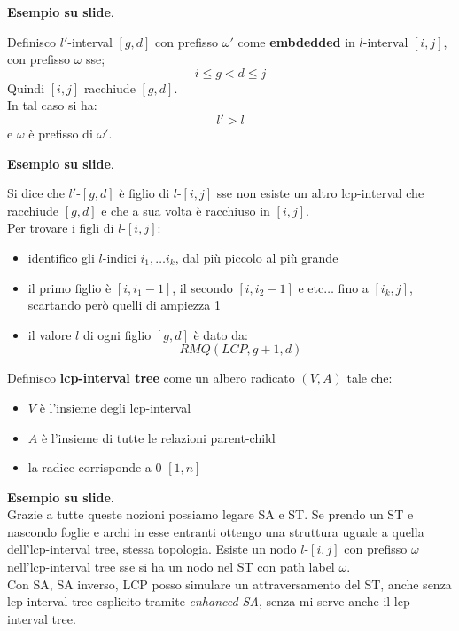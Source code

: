 \documentclass[a4paper,12pt, oneside]{book}
\begin{document}
\textbf{Esempio su slide}.\\
\begin{definizione}
  Definisco $l'$-interval $[g,d]$ con prefisso $\omega'$ come \textbf{embdedded}
  in $l$-interval $[i,j]$, con prefisso $\omega$ sse;
  \[i\leq g<d\leq j\]
  Quindi $[i,j]$ racchiude $[g,d]$.\\
  In tal caso si ha:
  \[l'>l\]
  e $\omega$ è prefisso di $\omega'$.
\end{definizione}
\textbf{Esempio su slide}.
\begin{definizione}
  Si dice che $l'$-$[g,d]$ è figlio di $l$-$[i,j]$ sse non esiste un altro
  lcp-interval che racchiude $[g,d]$ e che a sua volta è racchiuso in $[i,j]$.\\
  Per trovare i figli di $l$-$[i,j]$:
  \begin{itemize}
    \item identifico gli $l$-indici $i_1,\ldots i_k$, dal più piccolo al più
    grande
    \item il primo figlio è $[i,i_1-1]$, il secondo $[i,i_2-1]$ e etc$\ldots$
    fino a $[i_k,j]$, scartando però quelli di ampiezza 1
    \item il valore $l$ di ogni figlio $[g,d]$ è dato da:
    \[RMQ(LCP, g+1,d)\]
  \end{itemize}
\end{definizione}
\begin{definizione}
  Definisco \textbf{lcp-interval tree} come un albero radicato $(V,A)$ tale che:
  \begin{itemize}
    \item $V$ è l'insieme degli lcp-interval
    \item $A$ è l'insieme di tutte le relazioni parent-child
    \item la radice corrisponde a $0$-$[1,n]$
  \end{itemize}
\end{definizione}
\textbf{Esempio su slide}.\\
Grazie a tutte queste nozioni possiamo legare SA e ST. Se prendo un ST e
nascondo foglie e archi in esse entranti ottengo una struttura uguale a quella
dell'lcp-interval tree, stessa topologia. Esiste un nodo $l$-$[i,j]$ con
prefisso $\omega$ nell'lcp-interval tree sse si ha un nodo nel ST con path label
$\omega$. \\
Con SA, SA inverso, LCP  posso simulare un attraversamento del ST, anche senza
lcp-interval tree esplicito tramite \textit{enhanced SA}, senza mi serve anche
il lcp-interval tree.
\end{document}
